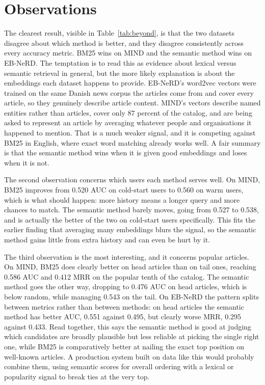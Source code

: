 \documentclass[11pt]{article}
\begin{document}
\section{Observations}
\label{sec:observations}

The clearest result, visible in Table~\ref{tab:beyond}, is that the two datasets disagree about
which method is better, and they disagree consistently across every accuracy metric. BM25 wins
on MIND and the semantic method wins on EB-NeRD. The temptation is to read this as evidence
about lexical versus semantic retrieval in general, but the more likely explanation is about
the embeddings each dataset happens to provide. EB-NeRD's word2vec vectors were trained on the
same Danish news corpus the articles come from and cover every article, so they genuinely
describe article content. MIND's vectors describe named entities rather than articles, cover
only 87 percent of the catalog, and are being asked to represent an article by averaging
whatever people and organisations it happened to mention. That is a much weaker signal, and it
is competing against BM25 in English, where exact word matching already works well. A fair
summary is that the semantic method wins when it is given good embeddings and loses when it is
not.

The second observation concerns which users each method serves well. On MIND, BM25 improves
from 0.520 AUC on cold-start users to 0.560 on warm users, which is what should happen: more
history means a longer query and more chances to match. The semantic method barely moves,
going from 0.527 to 0.538, and is actually the better of the two on cold-start users
specifically. This fits the earlier finding that averaging many embeddings blurs the signal, so
the semantic method gains little from extra history and can even be hurt by it.

The third observation is the most interesting, and it concerns popular articles. On MIND, BM25
does clearly better on head articles than on tail ones, reaching 0.586 AUC and 0.412 MRR on the
popular tenth of the catalog. The semantic method goes the other way, dropping to 0.476 AUC on
head articles, which is below random, while managing 0.543 on the tail. On EB-NeRD the pattern
splits between metrics rather than between methods: on head articles the semantic method has
better AUC, 0.551 against 0.495, but clearly worse MRR, 0.295 against 0.433. Read together,
this says the semantic method is good at judging which candidates are broadly plausible but
less reliable at picking the single right one, while BM25 is comparatively better at nailing
the exact top position on well-known articles. A production system built on data like this
would probably combine them, using semantic scores for overall ordering with a lexical or
popularity signal to break ties at the very top.
\end{document}
